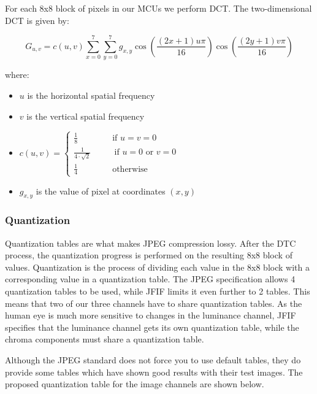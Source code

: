 \begin{infobox}
For each 8x8 block of pixels in our MCUs we perform DCT. The two-dimensional DCT is given by:

$$ G_{u,v} = c(u,v)\sum_{x=0}^{7}\sum_{y=0}^{7}g_{x,y}\cos{\left(\frac{(2x+1)u\pi}{16}\right)}\cos{\left(\frac{(2y+1)v\pi}{16}\right)} $$

where:
\begin{itemize}
	\item $u$ is the horizontal spatial frequency 
	\item $v$ is the vertical spatial frequency 
	\item $c(u,v) = \begin{cases}\frac{1}{8} \quad \quad \quad \quad\text{if } u=v=0\\ 
	                             \frac{1}{4 \cdot \sqrt{2}} \,~\quad\quad \text{ if } u = 0 \text{ or } v = 0\\
	                             \frac{1}{4} \quad \quad \quad \quad\text{otherwise}
	                             \end{cases} $
    \item $g_{x,y}$ is the value of pixel at coordinates $(x,y)$ 
\end{itemize}

\vspace{4mm}
\subsubsection*{Quantization}
\vspace{-2.5mm}
Quantization tables are what makes JPEG compression lossy. 
After the DTC process, the quantization progress is performed on the resulting 8x8 block of values.
Quantization is the process of dividing each value in the 8x8 block with a corresponding value in a quantization table. 
The JPEG specification allows 4 quantization tables to be used, while JFIF limits it even further to 2 tables. 
This means that two of our three channels have to share quantization tables. 
As the human eye is much more sensitive to changes in the luminance channel, JFIF specifies that the luminance channel gets its own quantization table, while the chroma components must share a quantization table.

Although the JPEG standard does not force you to use default tables, they do provide some tables which have shown good results with their test images. The proposed quantization table for the image channels are shown below.


\end{infobox}
